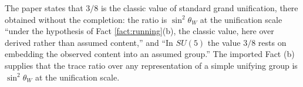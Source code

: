 The paper states that $3/8$ is the classic value of standard grand unification, there obtained without the completion: the ratio is $\sin^{2}\theta_{W}$ at the unification scale ``under the hypothesis of Fact \ref{fact:running}(b), the classic value, here over derived rather than assumed content,'' and ``In $SU(5)$ the value $3/8$ rests on embedding the observed content into an assumed group.'' The imported Fact (b) supplies that the trace ratio over any representation of a simple unifying group is $\sin^{2}\theta_{W}$ at the unification scale.
